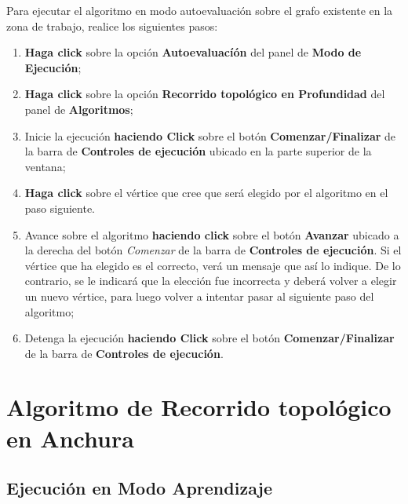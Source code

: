 \documentclass{book}
\begin{document}
Para ejecutar el algoritmo en modo autoevaluación sobre el grafo existente en la zona de trabajo, realice los siguientes pasos:
\medskip

\begin{enumerate}
	\itemsep=8pt \topsep=0pt \partopsep=0pt \parskip=0pt \parsep=0pt

	\item \textbf{Haga click} sobre la opción \textbf{Autoevaluacíón} del panel de \textbf{Modo de Ejecución};

	\item \textbf{Haga click} sobre la opción \textbf{Recorrido topológico en Profundidad} del panel de \textbf{Algoritmos};

	\item Inicie la ejecución \textbf{haciendo Click} sobre el botón \textbf{Comenzar/Finalizar} de la barra de \textbf{Controles de ejecución} ubicado en la parte superior de la ventana;

	\item \textbf{Haga click} sobre el vértice que cree que será elegido por el algoritmo en el paso siguiente.

	\item Avance sobre el algoritmo \textbf{haciendo click} sobre el botón \textbf{Avanzar} ubicado a la derecha del botón \textit{Comenzar} de la barra de \textbf{Controles de ejecución}. Si el vértice que ha elegido es el correcto, verá un mensaje que así lo indique. De lo contrario, se le indicará que la elección fue incorrecta y deberá volver a elegir un nuevo vértice, para luego volver a intentar pasar al siguiente paso del algoritmo;

	\item Detenga la ejecución \textbf{haciendo Click} sobre el botón \textbf{Comenzar/Finalizar} de la barra de \textbf{Controles de ejecución}.

\end{enumerate}
\medskip




%
%
\chapter{Algoritmo de Recorrido topológico en Anchura}


\section{Ejecución en Modo Aprendizaje}
\end{document}
